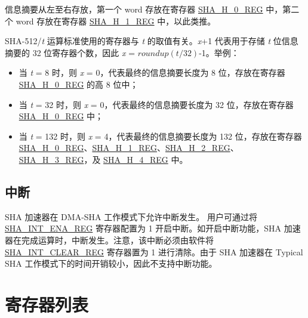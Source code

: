 \documentclass[main\_\_CN.tex]{subfiles}
\begin{document}
\begin{table}[H]
\begin{threeparttable}
        \begin{tablenotes}
            \item[1] 信息摘要从左至右存放，第一个 word 存放在寄存器 \hyperref[regdesc:SHAHNREG]{SHA\_H\_0\_REG} 中，第二个 word 存放在寄存器 \hyperref[regdesc:SHAHNREG]{SHA\_H\_1\_REG} 中，以此类推。
            \item[2] SHA-512/{\it{t}} 运算标准使用的寄存器与 {\it{t}} 的取值有关。{\it{x}}+1 代表用于存储 {\it{t}} 位信息摘要的 32 位寄存器个数，因此 {\it{x}} = \begin{math}roundup(t/32)\end{math}-1。举例：
                \begin{itemize}
                    \item 当 {\it{t}} = 8 时，则 {\it{x}} = 0，代表最终的信息摘要长度为 8 位，存放在寄存器 \hyperref[regdesc:SHAHNREG]{SHA\_H\_0\_REG} 的高 8 位中；
                    \item 当 {\it{t}} = 32 时，则 {\it{x}} = 0，代表最终的信息摘要长度为 32 位，存放在寄存器 \hyperref[regdesc:SHAHNREG]{SHA\_H\_0\_REG} 中；
                    \item 当 {\it{t}} = 132 时，则 {\it{x}} = 4，代表最终的信息摘要长度为 132 位，存放在寄存器 \hyperref[regdesc:SHAHNREG]{SHA\_H\_0\_REG}、\hyperref[regdesc:SHAHNREG]{SHA\_H\_1\_REG}、\hyperref[regdesc:SHAHNREG]{SHA\_H\_2\_REG}、\hyperref[regdesc:SHAHNREG]{SHA\_H\_3\_REG}，及 \hyperref[regdesc:SHAHNREG]{SHA\_H\_4\_REG} 中。
                    \end{itemize}
        \end{tablenotes}
    \end{threeparttable}
\end{table}

\subsection{ 中断 }\label{sec:sha-Interrupt}

SHA 加速器在 DMA-SHA 工作模式下允许中断发生。
 用户可通过将 \hyperref[regdesc:SHAINTENAREG]{SHA\_INT\_ENA\_REG} 寄存器配置为 1 开启中断。如开启中断功能，SHA 加速器在完成运算时，中断发生。注意，该中断必须由软件将 \hyperref[regdesc:SHAINTCLEARREG]{SHA\_INT\_CLEAR\_REG} 寄存器置为 1 进行清除。由于 SHA 加速器在 Typical SHA 工作模式下的时间开销较小，因此不支持中断功能。

\section{寄存器列表} \label{sec:sha-reg-summ}\hypertarget{sha-reg-summ}{}
\end{document}
